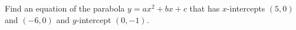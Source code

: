 Find an equation of the parabola $y=ax^2+bx+c$ that has $x$-intercepts $(5,0)$ and $(-6,0)$ and $y$-intercept $(0,-1)$.
